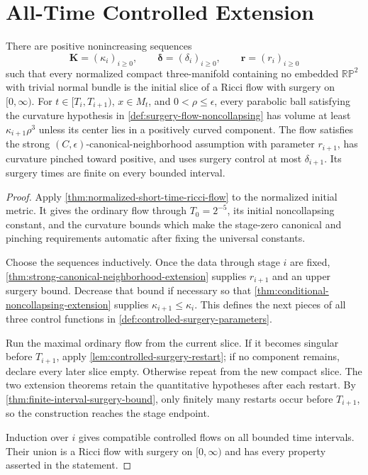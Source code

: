 \section{All-Time Controlled Extension}

\begin{theorem}
\label{thm:all-time-controlled-surgery-flow}
\notready
There are positive nonincreasing sequences
\[
 \mathbf K=(\kappa_i)_{i\ge0},\qquad
 \boldsymbol\delta=(\delta_i)_{i\ge0},\qquad
 \mathbf r=(r_i)_{i\ge0}
\]
such that every normalized compact three-manifold containing no embedded
$\mathbb{RP}^2$ with trivial normal bundle is the initial slice of a Ricci
flow with surgery on $[0,\infty)$.  For $t\in[T_i,T_{i+1})$, $x\in M_t$, and
$0<\rho\le\epsilon$, every parabolic ball satisfying the curvature hypothesis in
\ref{def:surgery-flow-noncollapsing} has volume at least
$\kappa_{i+1}\rho^3$ unless its center lies in a positively curved component.
The flow satisfies the strong $(C,\epsilon)$-canonical-neighborhood assumption
with parameter $r_{i+1}$, has curvature pinched toward positive, and uses
surgery control at most $\delta_{i+1}$.  Its surgery times are finite on every
bounded interval.
\end{theorem}

\begin{proof}
Apply \ref{thm:normalized-short-time-ricci-flow} to the normalized initial
metric.  It gives the ordinary flow through $T_0=2^{-5}$, its initial
noncollapsing constant, and the curvature bounds which make the stage-zero
canonical and pinching requirements automatic after fixing the universal
constants.

Choose the sequences inductively.  Once the data through stage $i$ are fixed,
\ref{thm:strong-canonical-neighborhood-extension} supplies $r_{i+1}$ and an
upper surgery bound.  Decrease that bound if necessary so that
\ref{thm:conditional-noncollapsing-extension} supplies
$\kappa_{i+1}\le\kappa_i$.  This defines the next pieces of all three
control functions in \ref{def:controlled-surgery-parameters}.

Run the maximal ordinary flow from the current slice.  If it becomes singular
before $T_{i+1}$, apply \ref{lem:controlled-surgery-restart}; if no component
remains, declare every later slice empty.  Otherwise repeat from the new
compact slice.  The two extension theorems retain the quantitative hypotheses
after each restart.  By \ref{thm:finite-interval-surgery-bound}, only finitely
many restarts occur before $T_{i+1}$, so the construction reaches the stage
endpoint.

Induction over $i$ gives compatible controlled flows on all bounded time
intervals.  Their union is a Ricci flow with surgery on $[0,\infty)$ and has
every property asserted in the statement.
\end{proof}
